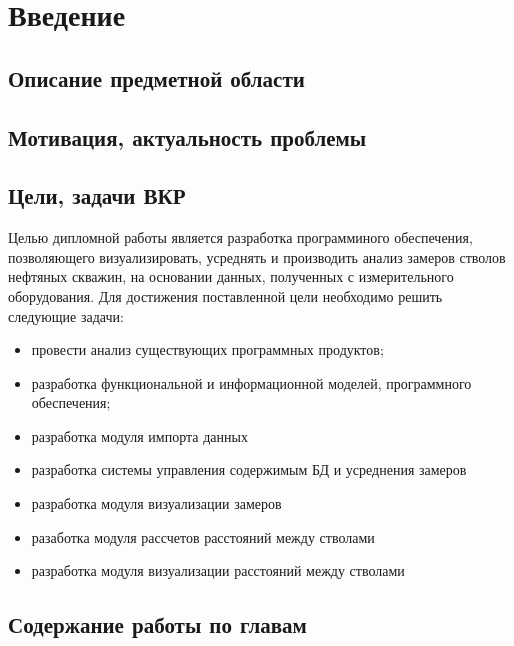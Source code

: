 \newpage
\section*{Введение}
\subsection*{Описание предметной области}

\subsection*{Мотивация, актуальность проблемы}

\subsection*{Цели, задачи ВКР}
Целью дипломной работы является разработка программиного обеспечения, позволяющего визуализировать, усреднять и производить анализ замеров стволов нефтяных скважин,
на основании данных, полученных с измерительного оборудования. Для достижения поставленной цели необходимо решить следующие задачи:
\begin{itemize}
  \item провести анализ существующих программных продуктов;
  \item разработка функциональной и информационной моделей, программного обеспечения;
  \item разработка модуля импорта данных
  \item разработка системы управления содержимым БД и усреднения замеров
  \item разработка модуля визуализации замеров
  \item разаботка модуля рассчетов расстояний между стволами
  \item разработка модуля визуализации расстояний между стволами
\end{itemize}

\subsection*{Содержание работы по главам}
